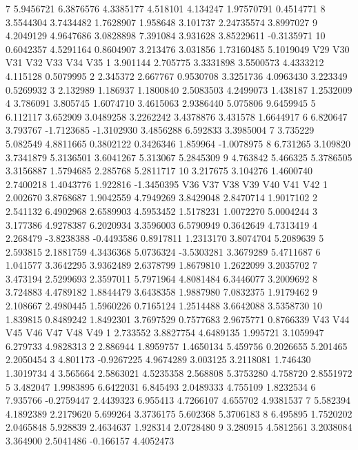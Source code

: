 \documentclass[12pt]{article}
\begin{document}
\begin{Schunk}
\begin{Soutput}
7  5.9456721 6.3876576  4.3385177 4.518101 4.134247 1.97570791  0.4514771
8  3.5544304 3.7434482  1.7628907 1.958648 3.101737 2.24735574  3.8997027
9  4.2049129 4.9647686  3.0828898 7.391084 3.931628 3.85229611 -0.3135971
10 0.6042357 4.5291164  0.8604907 3.213476 3.031856 1.73160485  5.1019049
        V29      V30        V31        V32       V33      V34        V35
1  3.901144 2.705775  3.3331898  3.5500573 4.4333212 4.115128  0.5079995
2  2.345372 2.667767  0.9530708  3.3251736 4.0963430 3.223349  0.5269932
3  2.132989 1.186937  1.1800840  2.5083503 4.2499073 1.438187  1.2532009
4  3.786091 3.805745  1.6074710  3.4615063 2.9386440 5.075806  9.6459945
5  6.112117 3.652909  3.0489258  3.2262242 3.4378876 3.431578  1.6644917
6  6.820647 3.793767 -1.7123685 -1.3102930 3.4856288 6.592833  3.3985004
7  3.735229 5.082549  4.8811665  0.3802122 0.3426346 1.859964 -1.0078975
8  6.731265 3.109820  3.7341879  5.3136501 3.6041267 5.313067  5.2845309
9  4.763842 5.466325  5.3786505  3.3156887 1.5794685 2.285768  5.2811717
10 3.217675 3.104276  1.4600740  2.7400218 1.4043776 1.922816 -1.3450395
        V36        V37        V38       V39        V40       V41       V42
1  2.002670  3.8768687  1.9042559 4.7949269  3.8429048 2.8470714 1.9017102
2  2.541132  6.4902968  2.6589903 4.5953452  1.5178231 1.0072270 5.0004244
3  3.177386  4.9278387  6.2020934 3.3596003  6.5790949 0.3642649 4.7313419
4  2.268479 -3.8238388 -0.4493586 0.8917811  1.2313170 3.8074704 5.2089639
5  2.593815  2.1881759  4.3436368 5.0736324 -3.5303281 3.3679289 5.4711687
6  1.041577  3.3642295  3.9362489 2.6378799  1.8679810 1.2622099 3.2035702
7  3.473194  2.5299693  2.3597011 5.7971964  4.8081484 6.3446077 3.2009692
8  3.724883  4.4789182  1.8844479 3.6438358  1.9887980 7.0832375 1.9179462
9  2.108667  2.4980445  1.5960226 0.7165124  1.2514488 3.6642088 3.5358730
10 1.839815  0.8489242  1.8492301 3.7697529  0.7577683 2.9675771 0.8766339
        V43        V44       V45      V46       V47       V48       V49
1  2.733552  3.8827754 4.6489135 1.995721 3.1059947  6.279733 4.9828313
2  2.886944  1.8959757 1.4650134 5.459756 0.2026655  5.201465 2.2050454
3  4.801173 -0.9267225 4.9674289 3.003125 3.2118081  1.746430 1.3019734
4  3.565664  2.5863021 4.5235358 2.568808 5.3753280  4.758720 2.8551972
5  3.482047  1.9983895 6.6422031 6.845493 2.0489333  4.755109 1.8232534
6  7.935766 -0.2759447 2.4439323 6.955413 4.7266107  4.655702 4.9381537
7  5.582394  4.1892389 2.2179620 5.699264 3.3736175  5.602368 5.3706183
8  6.495895  1.7520202 2.0465848 5.928839 2.4634637  1.928314 2.0728480
9  3.280915  4.5812561 3.2038084 3.364900 2.5041486 -0.166157 4.4052473

\end{Soutput}
\end{Schunk}
\end{document}
